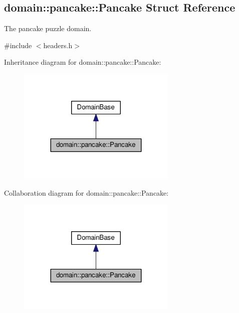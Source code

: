 \hypertarget{structdomain_1_1pancake_1_1Pancake}{}\subsection{domain\+:\+:pancake\+:\+:Pancake Struct Reference}
\label{structdomain_1_1pancake_1_1Pancake}


The pancake puzzle domain.  




{\ttfamily \#include $<$headers.\+h$>$}



Inheritance diagram for domain\+:\+:pancake\+:\+:Pancake\+:\nopagebreak
\begin{figure}[H]
\begin{center}
\leavevmode
\includegraphics[width=215pt]{structdomain_1_1pancake_1_1Pancake__inherit__graph}
\end{center}
\end{figure}


Collaboration diagram for domain\+:\+:pancake\+:\+:Pancake\+:\nopagebreak
\begin{figure}[H]
\begin{center}
\leavevmode
\includegraphics[width=215pt]{structdomain_1_1pancake_1_1Pancake__coll__graph}
\end{center}
\end{figure}
